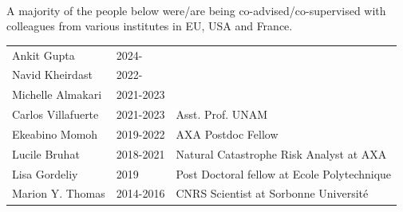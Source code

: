 \documentclass[10pt]{article}
\begin{document}
\subtitle{STUDENTS \& POSTDOCS}\\
A majority of the people below were/are being co-advised/co-supervised with colleagues from various institutes in EU, USA and France. 
\begin{table}[h!]
 \renewcommand{\arraystretch}{0.5}

 
\begin{tabular}{L{3.75cm}L{2cm}D{7cm}}
\color{groy}Ankit Gupta           & 2024-      &  \\
\color{groy}Navid Kheirdast       & 2022-      &  \\
\color{gray}Michelle Almakari     & 2021-2023  &  \\
\color{gray}Carlos Villafuerte    & 2021-2023  &  Asst. Prof. UNAM\\
\color{gray}Ekeabino Momoh   	  & 2019-2022  &  AXA Postdoc Fellow\\
\color{gray}Lucile Bruhat    	  & 2018-2021  &  Natural Catastrophe Risk Analyst at AXA\\
\color{gray}Lisa Gordeliy    	  & 2019       &  Post Doctoral fellow at Ecole Polytechnique\\
\color{gray}Marion Y. Thomas 	  & 2014-2016  &  CNRS Scientist at Sorbonne Université\\[16pt]
\end{tabular}



\end{table}
\end{document}
